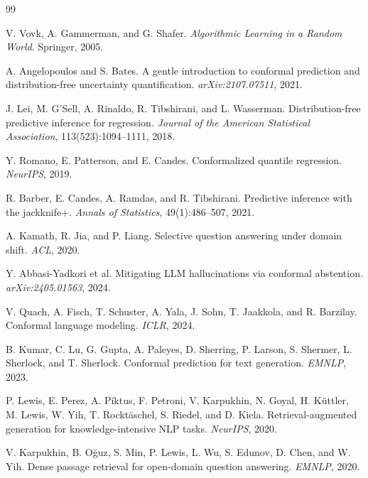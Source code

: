 \documentclass[11pt]{article}
\begin{document}

\begin{thebibliography}{99}

V. Vovk, A. Gammerman, and G. Shafer. \textit{Algorithmic Learning in a Random World}. Springer, 2005.

A. Angelopoulos and S. Bates. A gentle introduction to conformal prediction and distribution-free uncertainty quantification. \textit{arXiv:2107.07511}, 2021.

J. Lei, M. G'Sell, A. Rinaldo, R. Tibshirani, and L. Wasserman. Distribution-free predictive inference for regression. \textit{Journal of the American Statistical Association}, 113(523):1094--1111, 2018.

Y. Romano, E. Patterson, and E. Candes. Conformalized quantile regression. \textit{NeurIPS}, 2019.

R. Barber, E. Candes, A. Ramdas, and R. Tibshirani. Predictive inference with the jackknife+. \textit{Annals of Statistics}, 49(1):486--507, 2021.

A. Kamath, R. Jia, and P. Liang. Selective question answering under domain shift. \textit{ACL}, 2020.

Y. Abbasi-Yadkori et al. Mitigating LLM hallucinations via conformal abstention. \textit{arXiv:2405.01563}, 2024.

V. Quach, A. Fisch, T. Schuster, A. Yala, J. Sohn, T. Jaakkola, and R. Barzilay. Conformal language modeling. \textit{ICLR}, 2024.

B. Kumar, C. Lu, G. Gupta, A. Paleyes, D. Sherring, P. Larson, S. Shermer, L. Sherlock, and T. Sherlock. Conformal prediction for text generation. \textit{EMNLP}, 2023.

P. Lewis, E. Perez, A. Piktus, F. Petroni, V. Karpukhin, N. Goyal, H. K\"{u}ttler, M. Lewis, W. Yih, T. Rockt\"{a}schel, S. Riedel, and D. Kiela. Retrieval-augmented generation for knowledge-intensive NLP tasks. \textit{NeurIPS}, 2020.

V. Karpukhin, B. O\u{g}uz, S. Min, P. Lewis, L. Wu, S. Edunov, D. Chen, and W. Yih. Dense passage retrieval for open-domain question answering. \textit{EMNLP}, 2020.


\end{thebibliography}
\end{document}
